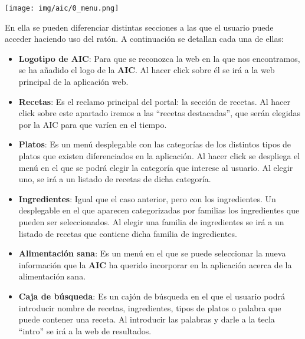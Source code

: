 \documentclass{\ClassPath/viu-tfm-template}
\begin{document}
\begin{center}
    \vspace{-10pt}
    \texttt{[image: img/aic/0\_menu.png]}
    \vspace{-20pt}
\end{center}

En ella se pueden diferenciar distintas secciones a las que el usuario puede acceder haciendo uso del ratón. A continuación se detallan cada una de ellas:

\vspace{-1em}
\begin{itemize}
    \item \textbf{Logotipo de AIC}: Para que se reconozca la web en la que nos encontramos, se ha añadido el logo de la \textbf{AIC}. Al hacer click sobre él se irá a la web principal de la aplicación web.

    \item \textbf{Recetas}: Es el reclamo principal del portal: la sección de recetas. Al hacer click sobre este apartado iremos a las “recetas destacadas”, que serán elegidas por la AIC para que varíen en el tiempo.

    \item \textbf{Platos}: Es un menú desplegable con las categorías de los distintos tipos de platos que existen diferenciados en la aplicación. Al hacer click se despliega el menú en el que se podrá elegir la categoría que interese al usuario. Al elegir uno, se irá a un listado de recetas de dicha categoría.

    \item \textbf{Ingredientes}: Igual que el caso anterior, pero con los ingredientes. Un desplegable en el que aparecen categorizadas por familias los ingredientes que pueden ser seleccionados. Al elegir una familia de ingredientes se irá a un listado de recetas que contiene dicha familia de ingredientes.

    \item \textbf{Alimentación sana}: Es un menú en el que se puede seleccionar la nueva información que la \textbf{AIC} ha querido incorporar en la aplicación acerca de la alimentación sana.

    \item \textbf{Caja de búsqueda}: Es un cajón de búsqueda en el que el usuario podrá introducir nombre de recetas, ingredientes, tipos de platos o palabra que puede contener una receta. Al introducir las palabras y darle a la tecla “intro” se irá a la web de resultados.


\end{itemize}
\end{document}
